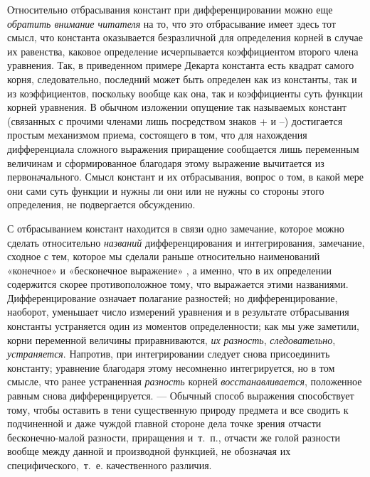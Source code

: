 Относительно отбрасывания констант при дифференцировании можно еще
{\em обратить внимание читателя} на то, что это
отбрасывание имеет здесь тот смысл, что константа оказывается безразличной
для определения корней в случае их равенства, каковое определение
исчерпывается коэффициентом второго члена уравнения. Так, в приведенном
примере Декарта константа есть квадрат самого корня, следовательно,
последний может быть определен как из константы, так и из коэффициентов,
поскольку вообще как она, так и коэффициенты суть функции корней уравнения.
В обычном изложении опущение так называемых констант (связанных с прочими
членами лишь посредством знаков + и –) достигается простым механизмом
приема, состоящего в том, что для нахождения дифференциала сложного
выражения приращение сообщается лишь переменным величинам и сформированное
благодаря этому выражение вычитается из первоначального. Смысл констант и
их отбрасывания, вопрос о том, в какой мере они сами суть функции и нужны
ли они или не нужны со стороны этого определения, не подвергается
обсуждению.

С отбрасыванием констант находится в связи одно замечание, которое можно
сделать относительно {\em названий} дифференцирования и
интегрирования, замечание, сходное с тем, которое мы сделали раньше
относительно наименований «конечное» и «бесконечное
выражение» , а именно, что в их
определении содержится скорее противоположное тому, что выражается этими
названиями. Дифференцирование означает полагание разностей; но
дифференцирование, наоборот, уменьшает число измерений уравнения и в
результате отбрасывания константы устраняется один из моментов
определенности; как мы уже заметили, корни переменной величины
приравниваются, {\em их разность},
{\em следовательно},
{\em устраняется}. Напротив, при интегрировании следует
снова присоединить константу; уравнение благодаря этому несомненно
интегрируется, но в том смысле, что ранее устраненная
{\em разность} корней
{\em восстанавливается}, положенное равным снова
дифференцируется. — Обычный способ выражения способствует тому, чтобы
оставить в тени существенную природу предмета и все сводить к подчиненной и
даже чуждой главной стороне дела точке зрения отчасти бесконечно-малой
разности, приращения и~т.~п., отчасти же голой разности вообще между данной
и производной функцией, не обозначая их специфического,~т.~е. качественного
различия.

